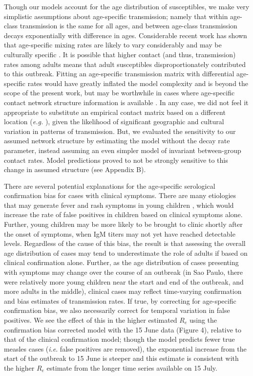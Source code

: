 Though our models account for the age distribution of susceptibles, we make very simplistic assumptions about age-specific transmission; namely that within age-class transmission is the same for all ages, and between age-class transmission decays exponentially with difference in ages. Considerable recent work has shown that age-specific mixing rates are likely to vary considerably and may be culturally specific \cite{Mossong_2008}. It is possible that higher contact (and thus, transmission) rates among adults means that adult susceptibles disproportionately contributed to this outbreak. Fitting an age-specific transmission matrix with differential age-specific rates would have greatly inflated the model complexity and is beyond the scope of the present work, but may be worthwhile in cases where age-specific contact network structure information is available \cite{327793}. In any case, we did not feel it appropriate to substitute an empirical contact matrix based on a different location (\emph{e.g.} \cite{Mossong_2008}), given the likelihood of significant geographic and cultural variation in patterns of transmission. But, we evaluated the sensitivity to our assumed network structure by estimating the model without the decay rate parameter, instead assuming an even simpler model of invariant between-group contact rates. Model predictions proved to not be strongly sensitive to this change in assumed structure (see Appendix B).

There are several potential explanations for the age-specific serological confirmation bias for cases with clinical symptoms. There are many etiologies that may generate fever and rash symptoms in young children \cite{Hutchins_2004,Ho_2014,GUY_2004,31c964}, which would increase the rate of false positives in children based on clinical symptoms alone. Further, young children may be more likely to be brought to clinic shortly after the onset of symptoms, when IgM titers may not yet have reached detectable levels. Regardless of the cause of this bias, the result is that assessing the overall age distribution of cases may tend to underestimate the role of adults if based on clinical confirmation alone. Further, as the age distribution of cases presenting with symptoms may change over the course of an outbreak (in Sao Paulo, there were relatively more young children near the start and end of the outbreak, and more adults in the middle), clinical cases may reflect time-varying confirmation and bias estimates of transmission rates. If true, by correcting for age-specific confirmation bias, we also necessarily correct for temporal variation in false positives. We see the effect of this in the higher estimated $R_e$ using the confirmation bias corrected model with the 15 June data (Figure 4), relative to that of the clinical confirmation model; though the model predicts fewer true measles cases (\emph{i.e}. false positives are removed), the exponential increase from the start of the outbreak to 15 June is steeper and this estimate is consistent with the higher $R_e$ estimate from the longer time series available on 15 July.


